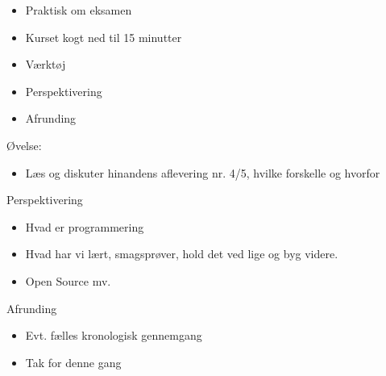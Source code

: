 \documentclass[a4paper,landscape]{slides}
\begin{document}
\begin{slide}
\begin{itemize}
   \item Praktisk om eksamen
   \item Kurset kogt ned til 15 minutter
   \item Værktøj
   \item Perspektivering
   \item Afrunding
\end{itemize} \end{slide} \begin{slide} \begin{center} {\large 
Øvelse:
} \end{center} \begin{itemize} \addtolength{\itemsep}{-\baselineskip}
   \item Læs og diskuter hinandens aflevering nr. 4/5, hvilke forskelle og hvorfor
\end{itemize} \end{slide} \begin{slide} \begin{center} {\large 
Perspektivering
} \end{center} \begin{itemize} \addtolength{\itemsep}{-\baselineskip}
       \item  Hvad er programmering
       \item  Hvad har vi lært, smagsprøver, hold det ved lige og byg videre.
       \item  Open Source mv. 
\end{itemize} \end{slide} \begin{slide} \begin{center} {\large 
Afrunding
} \end{center} \begin{itemize} \addtolength{\itemsep}{-\baselineskip}
       \item  Evt. fælles kronologisk gennemgang
       \item  Tak for denne gang
\end{itemize} \end{slide}


\begin{comment}
torsdag:
        centralitet
        netværk, shortest path,
        repetition - webapplikationer, sql
\end{comment}
\end{document}
